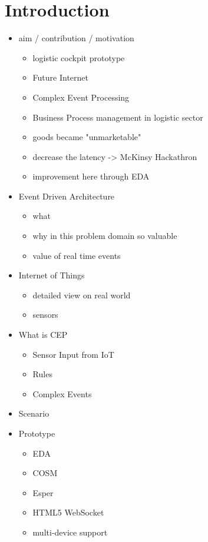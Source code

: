 \documentclass{acm_proc_article-sp}
\begin{document}
\section{Introduction}

\begin{itemize}
The aim of this project is to combine some of the state-of-the-art Future Internet(FI) technologies and using them to implement a prototype for a specific use-case that bring out the advantages of such a system.
The chosen use-case is a business process management in the logistic sector that handles with perishable goods. We focused on the reducing of the latency between the actual business event and the delivery of the information to improve the possibility to react quickly to this events and increase the value of this information as shown by Hackathorn\cite{hackathron:real_time_to_real_value}.
	\item aim / contribution / motivation
		\begin{itemize}
			\item logistic cockpit prototype
			\item Future Internet
			\item Complex Event Processing
			\item Business Process management in logistic sector
			\item goods became "unmarketable"
			\item decrease the latency -> McKinsy Hackathron
			\item improvement here through EDA
		\end{itemize}
	\item Event Driven Architecture
		\begin{itemize}
			\item what
			\item why in this problem domain so valuable 
			\item value of real time events
		\end{itemize}
	\item Internet of Things
		\begin{itemize}
			\item detailed view on real world
			\item sensors
		\end{itemize}
	\item What is CEP
		\begin{itemize}
			\item Sensor Input from IoT
			\item Rules
			\item Complex Events
		\end{itemize}
	\item Scenario
	\item Prototype
			\begin{itemize}
				\item EDA
				\item COSM
				\item Esper
				\item HTML5 WebSocket
				\item multi-device support
			\end{itemize}			
		

\end{itemize}
\end{document}

